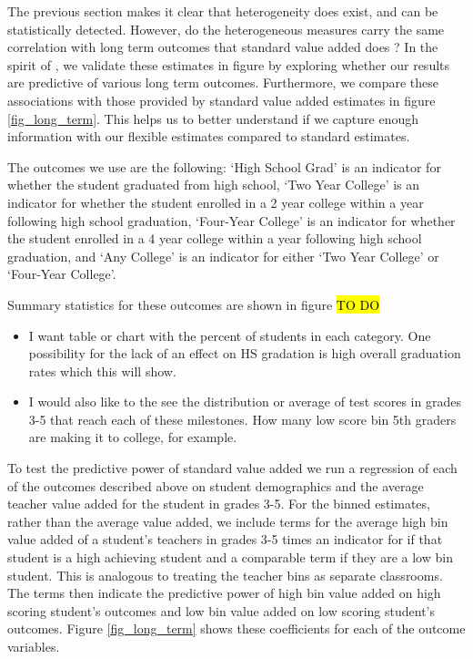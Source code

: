 \documentclass[12pt]{article}
\theoremstyle{definition}
\theoremstyle{definition}
\theoremstyle{definition}
\theoremstyle{definition}
\begin{document}
    The previous section makes it clear that heterogeneity does exist, and can be statistically detected. However, do the heterogeneous measures carry the same correlation with long term outcomes that standard value added does \citep{chetty2014measuring2}? In the spirit of \citet{chetty2014measuring2}, we validate these estimates in figure by exploring whether our results are predictive of various long term outcomes. Furthermore, we compare these associations with those provided by standard value added estimates in figure \ref{fig_long_term}. This helps us to better understand if we capture enough information with our flexible estimates compared to standard estimates.
    
    The outcomes we use are the following: `High School Grad' is an indicator for whether the student graduated from high school, `Two Year College' is an indicator for whether the student enrolled in a 2 year college within a year following high school graduation, `Four-Year College' is an indicator for whether the student enrolled in a 4 year college within a year following high school graduation, and `Any College' is an indicator for either `Two Year College' or `Four-Year College'. 
    
    Summary statistics for these outcomes are shown in figure \hl{TO DO}
    \begin{itemize}
        \item I want table or chart with the percent of students in each category. One possibility for the lack of an effect on HS gradation is high overall graduation rates which this will show. 
        \item I would also like to the see the distribution or average of test scores in grades 3-5 that reach each of these milestones. How many low score bin 5th graders are making it to college, for example. 
    \end{itemize}
    
    To test the predictive power of standard value added we run a regression of each of the outcomes described above on student demographics and the average teacher value added for the student in grades 3-5. For the binned estimates, rather than the average value added, we include terms for the average high bin value added of a student's teachers in grades 3-5 times an indicator for if that student is a high achieving student and a comparable term if they are a low bin student. This is analogous to treating the teacher bins as separate classrooms. The terms then indicate the predictive power of high bin value added on high scoring student's outcomes and low bin value added on low scoring student's outcomes. Figure \ref{fig_long_term} shows these coefficients for each of the outcome variables. 
\end{document}
